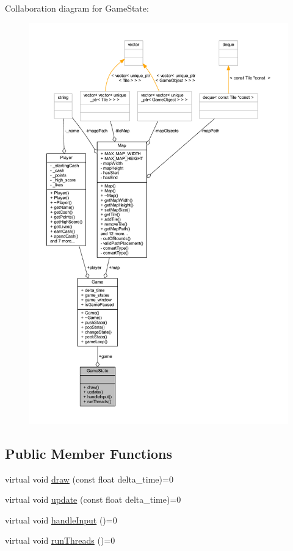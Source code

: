 Collaboration diagram for Game\+State\+:
\nopagebreak
\begin{figure}[H]
\begin{center}
\leavevmode
\includegraphics[width=350pt]{class_game_state__coll__graph}
\end{center}
\end{figure}
\subsection*{Public Member Functions}
\begin{DoxyCompactItemize}
\item 
virtual void \hyperlink{class_game_state_a55a6a68aabdf7054ea0e6ddbf24902df}{draw} (const float delta\+\_\+time)=0
\item 
virtual void \hyperlink{class_game_state_ad331d02d3989271b8cbc88fcb1448959}{update} (const float delta\+\_\+time)=0
\item 
virtual void \hyperlink{class_game_state_a970b55edd5a1da31ea0f7113e2c1f85a}{handle\+Input} ()=0
\item 
virtual void \hyperlink{class_game_state_a98cd49f1d8fd9fc3e79d607a238ba518}{run\+Threads} ()=0
\end{DoxyCompactItemize}

